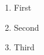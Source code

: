 \documentclass{article}
\begin{document}
\begin{enumerate}
	\item First
	\item Second
	\item Third
\end{enumerate}
\end{document}
